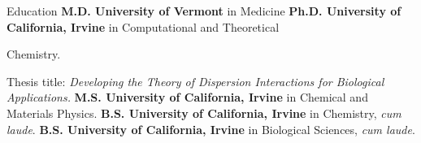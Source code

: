 \begin{rubric}{Education}
  \textbf{M.D. University of Vermont} in Medicine
%
  \textbf{Ph.D. University of California, Irvine} in Computational and Theoretical

  Chemistry.
  \par Thesis title: \emph{Developing the Theory of Dispersion Interactions for Biological Applications.}
%
  \textbf{M.S. University of California, Irvine} in Chemical and Materials Physics.
%
  \textbf{B.S. University of California, Irvine} in Chemistry, \textit{cum laude}.
%
  \textbf{B.S. University of California, Irvine} in Biological Sciences, \textit{cum laude}.
\end{rubric}
